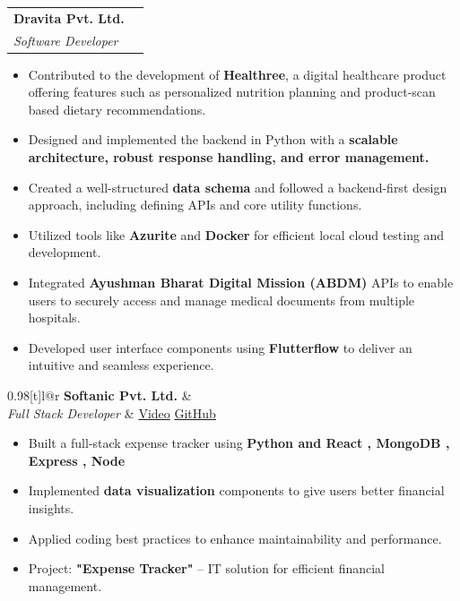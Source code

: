 \documentclass[a4paper,11pt]{article}
\makeatletter
\newcommand{\resumeSubheading}[4]{
\vspace{0.5mm}\item
    \begin{tabular*}{0.98\textwidth}[t]{l@{\extracolsep{\fill}}r}
        \textbf{#1} & \textit{\footnotesize{#4}} \\
        \textit{\footnotesize{#3}} &  \footnotesize{#2}\\
    \end{tabular*}
    \vspace{-2.4mm}
}
\newcommand{\resumeItemListStart}{\begin{justify}\begin{itemize}[leftmargin=3ex, rightmargin=2ex, noitemsep,labelsep=1.2mm,itemsep=0mm]\small}
\newcommand{\resumeItemListEnd}{\end{itemize}\end{justify}\vspace{-2mm}}
\makeatother
\begin{document}
  \resumeSubheading
    {Dravita Pvt. Ltd.}{}
    {Software Developer}{}%
    \resumeItemListStart
        \item {Contributed to the development of \textbf{Healthree}, a digital healthcare product offering features such as personalized nutrition planning and product-scan based dietary recommendations.}
        \item {Designed and implemented the backend in Python with a  \textbf{scalable architecture, robust response handling, and error management.}}
        \item {Created a well-structured \textbf{data schema} and followed a backend-first design approach, including defining APIs and core utility functions.}
        \item {Utilized tools like \textbf{Azurite} and \textbf{Docker} for efficient local cloud testing and development.}
        \item {Integrated \textbf{Ayushman Bharat Digital Mission (ABDM)} APIs to enable users to securely access and manage medical documents from multiple hospitals.}
        \item {Developed user interface components using \textbf{Flutterflow} to deliver an intuitive and seamless experience.}
    \resumeItemListEnd



     \resumeSubheading
    {Softanic Pvt. Ltd.}{%
      \href{https://www.linkedin.com/posts/jayesh-wankhede-a-programmer-web-designer_expensetracker-financialfreedom-techinnovation-activity-7100451840512712704-uS1I?utm_source=share&utm_medium=member_desktop}{\color{blue}Video} \hspace{0.2cm}
      \href{https://github.com/jay-3107/Expense-Tracker}{\color{blue}GitHub}
    }
    {Full Stack Developer }{}%
    \resumeItemListStart
      \item {Built a full-stack expense tracker using  \textbf{Python and React , MongoDB , Express , Node} }
      \item {Implemented  \textbf{data visualization }components to give users better financial insights.}
      \item {Applied coding best practices to enhance maintainability and performance.}
      \item {Project: \textbf{"Expense Tracker"} – IT solution for efficient financial management.}
    \resumeItemListEnd
\end{document}
